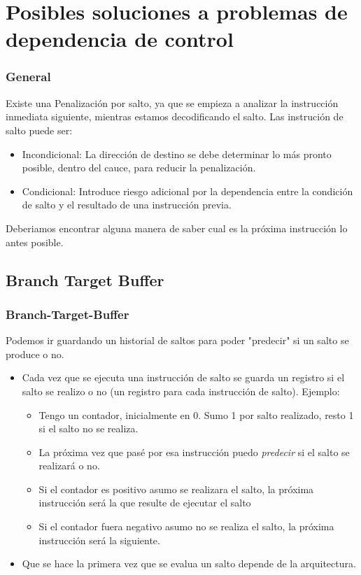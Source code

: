 \documentclass{beamer}
\begin{document}
\section{Posibles soluciones a problemas de dependencia de control}
\begin{frame}
\frametitle{General}
Existe una Penalización por salto, ya que se empieza a analizar la instrucción inmediata siguiente, mientras estamos decodificando el salto. Las instrución de salto puede ser: 
\begin{itemize}
\item Incondicional: La dirección de destino se debe determinar lo más pronto posible, dentro del cauce, para reducir la penalización.
\item Condicional: Introduce riesgo adicional por la dependencia entre la condición de salto y el resultado de una instrucción previa.
\end{itemize}
Deberiamos encontrar alguna manera de saber cual es la próxima instrucción lo antes posible.
\end{frame}


\subsection{Branch Target Buffer}
\begin{frame}
\frametitle{Branch-Target-Buffer}
Podemos ir guardando un historial de saltos para poder "predecir" si un salto se produce o no.
\begin{itemize}
\item Cada vez que se ejecuta una instrucción de salto se guarda un registro si el salto se realizo o no (un registro para cada instrucción de salto). Ejemplo:
\begin{itemize}
\item Tengo un contador, inicialmente en 0. Sumo 1 por salto realizado, resto 1 si el salto no se realiza.
\item La próxima vez que pasé por esa instrucción puedo \emph{predecir} si el salto se realizará o no. 
\item Si el contador es positivo asumo se realizara el salto, la próxima instrucción será la que resulte de ejecutar el salto
\item Si el contador fuera negativo asumo no se realiza el salto, la próxima instrucción será la siguiente.
\end{itemize}
\item Que se hace la primera vez que se evalua un salto depende de la arquitectura.
\end{itemize}
\end{frame}
\end{document}
